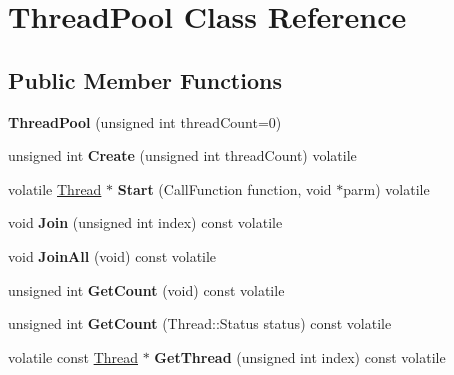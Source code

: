 \hypertarget{classThreadPool}{}\section{Thread\+Pool Class Reference}
\label{classThreadPool}
\subsection*{Public Member Functions}
\begin{DoxyCompactItemize}
\item 
\hypertarget{classThreadPool_a54816569a2bea890080730aa0d3fc493}{}{\bfseries Thread\+Pool} (unsigned int thread\+Count=0)\label{classThreadPool_a54816569a2bea890080730aa0d3fc493}

\item 
\hypertarget{classThreadPool_abdda020d8452643cd49348b4ecb3fe62}{}unsigned int {\bfseries Create} (unsigned int thread\+Count) volatile\label{classThreadPool_abdda020d8452643cd49348b4ecb3fe62}

\item 
\hypertarget{classThreadPool_afcf9dc90b65c679ba7ebc4b30f848a17}{}volatile \hyperlink{structThread}{Thread} $\ast$ {\bfseries Start} (Call\+Function function, void $\ast$parm) volatile\label{classThreadPool_afcf9dc90b65c679ba7ebc4b30f848a17}

\item 
\hypertarget{classThreadPool_a14bdb63f262df63a9e78b12bdbde1100}{}void {\bfseries Join} (unsigned int index) const  volatile\label{classThreadPool_a14bdb63f262df63a9e78b12bdbde1100}

\item 
\hypertarget{classThreadPool_a61e0affcecbf089892cc0a0985a46521}{}void {\bfseries Join\+All} (void) const  volatile\label{classThreadPool_a61e0affcecbf089892cc0a0985a46521}

\item 
\hypertarget{classThreadPool_a0fea93e76384e56ea6fac3a1a52ef749}{}unsigned int {\bfseries Get\+Count} (void) const  volatile\label{classThreadPool_a0fea93e76384e56ea6fac3a1a52ef749}

\item 
\hypertarget{classThreadPool_ae3a7ab9a3cf7d742bfa6ce25193b0b15}{}unsigned int {\bfseries Get\+Count} (Thread\+::\+Status status) const  volatile\label{classThreadPool_ae3a7ab9a3cf7d742bfa6ce25193b0b15}

\item 
\hypertarget{classThreadPool_a08aec452aedfbdb53f5b676661f073a9}{}volatile const \hyperlink{structThread}{Thread} $\ast$ {\bfseries Get\+Thread} (unsigned int index) const  volatile\label{classThreadPool_a08aec452aedfbdb53f5b676661f073a9}


\end{DoxyCompactItemize}
